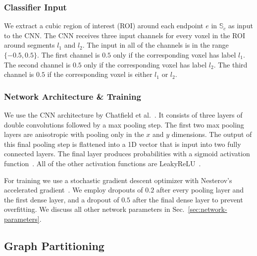 \subsubsection{Classifier Input}

We extract a cubic region of interest (ROI) around each endpoint $e$ in $\mathbb{S}_c$ as input to the CNN. The CNN receives three input channels for every voxel in the ROI around segments $l_1$ and $l_2$. The input in all of the channels is in the range $\{-0.5, 0.5\}$. The first channel is $0.5$ only if the corresponding voxel has label $l_1$. The second channel is $0.5$ only if the corresponding voxel has label $l_2$. The third channel is $0.5$ if the corresponding voxel is either $l_1$ or $l_2$.

\subsubsection{Network Architecture \& Training}

We use the CNN architecture by Chatfield et al.~\cite{chatfield2014return}. It consists of three layers of double convolutions followed by a max pooling step. The first two max pooling layers are anisotropic with pooling only in the $x$ and $y$ dimensions. The output of this final pooling step is flattened into a 1D vector that is input into two fully connected layers. The final layer produces probabilities with a sigmoid activation function~\cite{funahashi1989approximate}. All of the other activation functions are LeakyReLU~\cite{maas2013rectifier}.

For training we use a stochastic gradient descent optimizer with Nesterov's accelerated gradient~\cite{nesterov1983method}. We employ dropouts of $0.2$ after every pooling layer and the first dense layer, and a dropout of $0.5$ after the final dense layer to prevent overfitting. We discuss all other network parameters in Sec.~\ref{sec:network-parameters}.


\subsection{Graph Partitioning}

